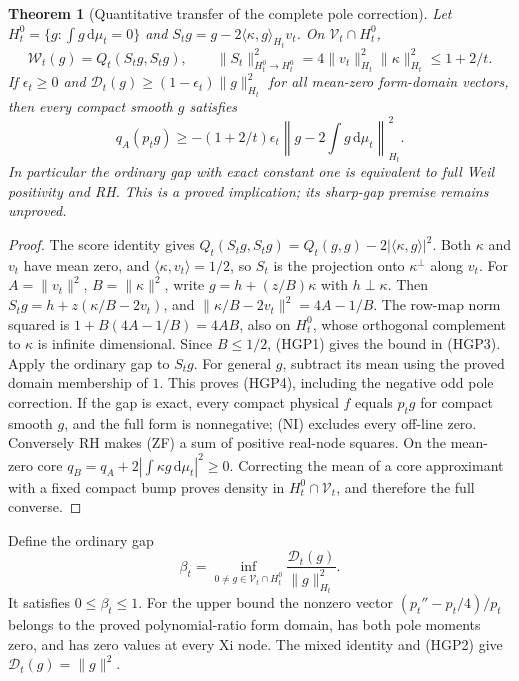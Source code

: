 \documentclass[11pt]{article}
\newtheorem{theorem}{Theorem}
\theoremstyle{remark}\newtheorem{remark}[theorem]{Remark}
\newcommand{\dd}{\,\mathrm d}
\begin{document}
\begin{theorem}[Quantitative transfer of the complete pole correction]
\label{thm:heat-gap-transfer}
Let $H_t^0=\{g:\int g\dd\mu_t=0\}$ and
$S_tg=g-2\langle\kappa,g\rangle_{H_t}v_t$. On
$\mathcal V_t\cap H_t^0$,
\[
 \mathcal W_t(g)=Q_t(S_tg,S_tg),\qquad
 \|S_t\|_{H_t^0\to H_t^0}^2
       =4\|v_t\|_{H_t}^2\|\kappa\|_{H_t}^2\le1+2/t .
                                                               \tag{HGP3}
\]
If $\epsilon_t\ge0$ and
$\mathcal D_t(g)\ge(1-\epsilon_t)\|g\|_{H_t}^2$ for all
mean-zero form-domain vectors, then every compact smooth $g$
satisfies
\[
 q_A(p_tg)\ge-(1+2/t)\epsilon_t
       \left\|g-2\int g\dd\mu_t\right\|_{H_t}^2 .        \tag{HGP4}
\]
In particular the ordinary gap with exact constant one is
equivalent to full Weil positivity and RH. This is a proved
implication; its sharp-gap premise remains unproved.
\end{theorem}
\begin{proof}
The score identity gives
$Q_t(S_tg,S_tg)=Q_t(g,g)-2|\langle\kappa,g\rangle|^2$.
Both $\kappa$ and $v_t$ have mean zero, and
$\langle\kappa,v_t\rangle=1/2$, so $S_t$ is the projection
onto $\kappa^\perp$ along $v_t$. For
$A=\|v_t\|^2$, $B=\|\kappa\|^2$, write
$g=h+(z/B)\kappa$ with $h\perp\kappa$. Then
$S_tg=h+z(\kappa/B-2v_t)$, and
$\|\kappa/B-2v_t\|^2=4A-1/B$.
The row-map norm squared is $1+B(4A-1/B)=4AB$,
also on $H_t^0$, whose orthogonal complement to $\kappa$
is infinite dimensional. Since $B\le1/2$, (HGP1) gives
the bound in (HGP3).
Apply the ordinary gap to $S_tg$. For general $g$, subtract
its mean using the proved domain membership of $1$.
This proves (HGP4), including the negative odd pole correction.
If the gap is exact, every compact physical $f$ equals $p_tg$
for compact smooth $g$, and the full form is nonnegative;
(NI) excludes every off-line zero. Conversely RH makes
(ZF) a sum of positive real-node squares. On the mean-zero
core $q_B=q_A+2|\int\kappa g\dd\mu_t|^2\ge0$.
Correcting the mean of a core approximant with a fixed
compact bump proves density in $H_t^0\cap\mathcal V_t$,
and therefore the full converse.
\end{proof}

Define the ordinary gap
\[
 \beta_t=\inf_{0\ne g\in\mathcal V_t\cap H_t^0}
                       \frac{\mathcal D_t(g)}{\|g\|_{H_t}^2}.
                                                               \tag{HFL1}
\]
It satisfies $0\le\beta_t\le1$. For the upper bound the
nonzero vector $(p_t''-p_t/4)/p_t$ belongs to the proved
polynomial-ratio form domain, has both pole moments zero,
and has zero values at every Xi node. The mixed identity
and (HGP2) give $\mathcal D_t(g)=\|g\|^2$.
\end{document}
